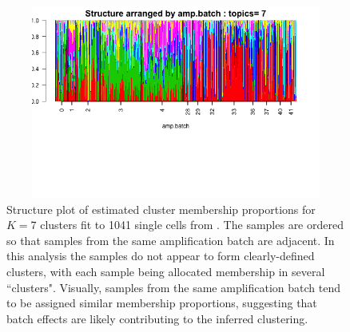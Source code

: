 % 

\begin{figure}[ht]
\centering
\includegraphics[height=2.5in, width=4.5in]{../plots/Jaitin_struct_clus_7_amp_batch.png}
\caption{Structure plot of estimated cluster membership proportions for $K=7$ clusters fit to 1041 single cells from \cite{Jaitin2014}. The samples are ordered so that samples from the same amplification batch are adjacent. In this analysis the samples do not appear to form clearly-defined clusters, with each sample being allocated membership in several ``clusters". Visually, samples from the same amplification batch tend to be assigned similar membership proportions, suggesting that batch effects are likely contributing to the inferred clustering.}
\label{fig:fig3}
\end{figure}



